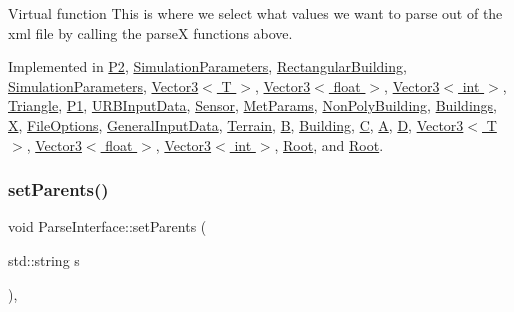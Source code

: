Virtual function This is where we select what values we want to parse out of the xml file by calling the parseX functions above. 

Implemented in \hyperlink{classP2_a3b8928a6e7dda94f06dab603420cd8c7}{P2}, \hyperlink{classSimulationParameters_a306c6d373794f5186beec9026f56845c}{Simulation\+Parameters}, \hyperlink{classRectangularBuilding_adbc6b832c817fc06f9bc2e51561a7e81}{Rectangular\+Building}, \hyperlink{classSimulationParameters_a306c6d373794f5186beec9026f56845c}{Simulation\+Parameters}, \hyperlink{classVector3_a15a1271a3ba4497ca95cc4dd66481f9e}{Vector3$<$ T $>$}, \hyperlink{classVector3_a15a1271a3ba4497ca95cc4dd66481f9e}{Vector3$<$ float $>$}, \hyperlink{classVector3_a15a1271a3ba4497ca95cc4dd66481f9e}{Vector3$<$ int $>$}, \hyperlink{classTriangle_a3b08ac99b202202bf7dbf2504da91ba1}{Triangle}, \hyperlink{classP1_aea4d99ff4e45862292d2dbb83ec32363}{P1}, \hyperlink{classURBInputData_a3fea38ec8d574eb8e5c9ee5f1ad53636}{U\+R\+B\+Input\+Data}, \hyperlink{classSensor_a570a911466a9fd98894f7c2f2abaf103}{Sensor}, \hyperlink{classMetParams_ad40706e0668d5e0248f39cc3a480b0af}{Met\+Params}, \hyperlink{classNonPolyBuilding_ace133756e0233d75b434fec5273b4414}{Non\+Poly\+Building}, \hyperlink{classBuildings_a97851dd190977ba999ecb1f50481c400}{Buildings}, \hyperlink{classX_a0d0aabf7efbe8356894613e58b736216}{X}, \hyperlink{classFileOptions_aca2f6304ed7d1fdde5c6c392d7fd11b9}{File\+Options}, \hyperlink{classGeneralInputData_a674714bd018eea1a601ae9c4b8212c4a}{General\+Input\+Data}, \hyperlink{classTerrain_a4258f6f5195a3be6c7afa3e4f03bd227}{Terrain}, \hyperlink{classB_abf3989a414e46fb5dd4bd15a279008ab}{B}, \hyperlink{classBuilding_a7782e7933a009fcfee4d186e62d34b43}{Building}, \hyperlink{classC_a7f8b8fa8187ab2f50ca999ae9a1687d7}{C}, \hyperlink{classA_a71896ec8a87fd03a725668c503ec64e7}{A}, \hyperlink{classD_afd52a3aa7a7e9047386deb6aeb796b2a}{D}, \hyperlink{classVector3_a15a1271a3ba4497ca95cc4dd66481f9e}{Vector3$<$ T $>$}, \hyperlink{classVector3_a15a1271a3ba4497ca95cc4dd66481f9e}{Vector3$<$ float $>$}, \hyperlink{classVector3_a15a1271a3ba4497ca95cc4dd66481f9e}{Vector3$<$ int $>$}, \hyperlink{classRoot_ade0eb65da55fa8c045a76bcf1fb16009}{Root}, and \hyperlink{classRoot_ade0eb65da55fa8c045a76bcf1fb16009}{Root}.

\mbox{\label{classParseInterface_a000ce4b52a192d2a7d0bfeaeb38fc358}} 
\subsubsection{\texorpdfstring{set\+Parents()}{setParents()}\hspace{0.1cm}{\footnotesize\ttfamily [1/3]}}
{\footnotesize\ttfamily void Parse\+Interface\+::set\+Parents (\begin{DoxyParamCaption}\item[{std\+::string}]{s }\end{DoxyParamCaption})\hspace{0.3cm}{\ttfamily [inline]}, {\ttfamily [protected]}}

